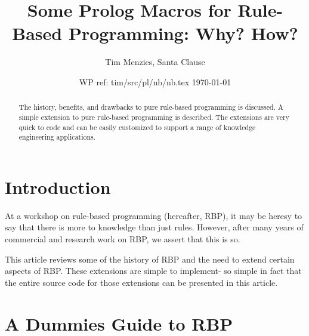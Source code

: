 \documentclass[twocolumn,global]{sys/svjour}
\date{WP ref: tim/src/pl/nb/nb.tex \today} %
\begin{document}
\title{Some Prolog Macros for Rule-Based Programming: Why? How?}
\author{Tim Menzies, Santa Clause}

 \maketitle
%

\thispagestyle{empty}  %
\pagestyle{plain} %

\begin{abstract}
The history, benefits, and drawbacks to pure rule-based programming
is discussed. A simple extension to pure rule-based programming is
described. The extensions are very quick to code and can be   easily
customized to support a range of knowledge engineering applications.
\end{abstract}

\section{Introduction}
At a workshop on rule-based programming (hereafter, RBP), it may be
heresy to say that there is more to knowledge than just rules.
However, after many years of commercial and research work on RBP, we
assert that this is so.

This article reviews some of the history of RBP and the need to
extend certain aspects of RBP. These extensions are simple to
implement- so simple in fact that the entire source code for those
extensions can be presented in this article.

\section{A Dummies Guide to RBP}
\end{document}
